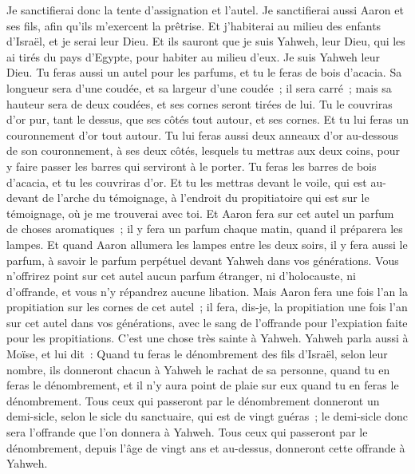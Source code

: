 \begin{multicols}{2}
Je sanctifierai donc la tente d'assignation et l'autel. Je sanctifierai aussi Aaron et ses fils, afin qu'ils m'exercent la prêtrise.
 Et j'habiterai au milieu des enfants d'Israël, et je serai leur Dieu.
Et ils sauront que je suis Yahweh, leur Dieu, qui les ai tirés du pays d'Egypte, pour habiter au milieu d'eux. Je suis Yahweh leur Dieu.
\VerseOne{}Tu feras aussi un autel pour les parfums, et tu le feras de bois d'acacia.
Sa longueur sera d'une coudée, et sa largeur d'une coudée~; il sera carré~; mais sa hauteur sera de deux coudées, et ses cornes seront tirées de lui.
Tu le couvriras d'or pur, tant le dessus, que ses côtés tout autour, et ses cornes. Et tu lui feras un couronnement d'or tout autour.
Tu lui feras aussi deux anneaux d'or au-dessous de son couronnement, à ses deux côtés, lesquels tu mettras aux deux coins, pour y faire passer les barres qui serviront à le porter.
Tu feras les barres de bois d'acacia, et tu les couvriras d'or.
Et tu les mettras devant le voile, qui est au-devant de l'arche du témoignage, à l'endroit du propitiatoire qui est sur le témoignage, où je me trouverai avec toi.
Et Aaron fera sur cet autel un parfum de choses aromatiques~; il y fera un parfum chaque matin, quand il préparera les lampes.
Et quand Aaron allumera les lampes entre les deux soirs, il y fera aussi le parfum, à savoir le parfum perpétuel devant Yahweh dans vos générations.
Vous n'offrirez point sur cet autel aucun parfum étranger, ni d'holocauste, ni d'offrande, et vous n'y répandrez aucune libation.
Mais Aaron fera une fois l'an la propitiation sur les cornes de cet autel~; il fera, dis-je, la propitiation une fois l'an sur cet autel dans vos générations, avec le sang de l'offrande pour l'expiation faite pour les propitiations. C'est une chose très sainte à Yahweh.
Yahweh parla aussi à Moïse, et lui dit~:
Quand tu feras le dénombrement des fils d'Israël, selon leur nombre, ils donneront chacun à Yahweh le rachat de sa personne, quand tu en feras le dénombrement, et il n'y aura point de plaie sur eux quand tu en feras le dénombrement.
Tous ceux qui passeront par le dénombrement donneront un demi-sicle, selon le sicle du sanctuaire, qui est de vingt guéras~; le demi-sicle donc sera l'offrande que l'on donnera à Yahweh.
Tous ceux qui passeront par le dénombrement, depuis l'âge de vingt ans et au-dessus, donneront cette offrande à Yahweh.

\end{multicols}

